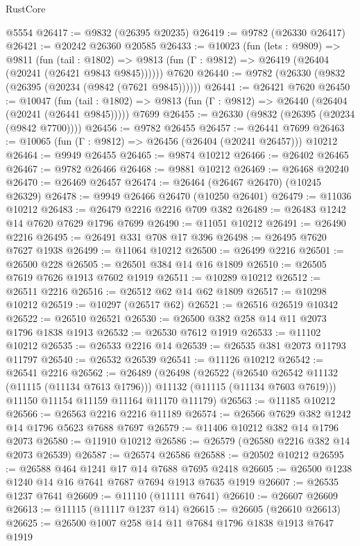 \begin{lexlean}{RustCore}
\begin{coremodule}
    @5554
@26417 := @9832 (@26395 @20235)
@26419 := @9782 (@26330 @26417)
@26421 := @20242 @26360 @20585
@26433 := @10023
    (fun (lets : @9809) =>
    @9811
      (fun (tail : @1802) =>
      @9813 (fun (Γ : @9812) => @26419 (@26404 (@20241 (@26421 @9843 @9845))))))
    @7620
@26440 := @9782 (@26330 (@9832 (@26395 (@20234 (@9842 (@7621 @9845))))))
@26441 := @26421 @7620
@26450 := @10047
    (fun (tail : @1802) => @9813 (fun (Γ : @9812) => @26440 (@26404 (@20241 (@26441 @9845)))))
    @7699
@26455 := @26330 (@9832 (@26395 (@20234 (@9842 @7700))))
@26456 := @9782 @26455
@26457 := @26441 @7699
@26463 := @10065 (fun (Γ : @9812) => @26456 (@26404 (@20241 @26457))) @10212
@26464 := @9949 @26455
@26465 := @9874 @10212
@26466 := @26402 @26465
@26467 := @9782 @26466
@26468 := @9881 @10212
@26469 := @26468 @20240
@26470 := @26469 @26457
@26474 := @26464 (@26467 @26470) (@10245 @26329)
@26478 := @9949 @26466 @26470 (@10250 @26401)
@26479 := @11036 @10212
@26483 := @26479 @2216 @2216 @709 @382
@26489 := @26483 @1242 @14 @7620 @7629 @1796 @7699
@26490 := @11051 @10212
@26491 := @26490 @2216
@26495 := @26491 @331 @708 @17 @396
@26498 := @26495 @7620 @7627 @1938
@26499 := @11064 @10212
@26500 := @26499 @2216
@26501 := @26500 @228
@26505 := @26501 @384 @14 @16 @1809
@26510 := @26505 @7619 @7626 @1913 @7602 @1919
@26511 := @10289 @10212
@26512 := @26511 @2216
@26516 := @26512 @62 @14 @62 @1809
@26517 := @10298 @10212
@26519 := @10297 (@26517 @62)
@26521 := @26516 @26519 @10342
@26522 := @26510 @26521
@26530 := @26500 @382 @258 @14 @11 @2073 @1796 @1838 @1913
@26532 := @26530 @7612 @1919
@26533 := @11102 @10212
@26535 := @26533 @2216 @14
@26539 := @26535 @381 @2073 @11793 @11797
@26540 := @26532 @26539
@26541 := @11126 @10212
@26542 := @26541 @2216
@26562 := @26489
    (@26498
      (@26522
        (@26540 @26542 @11132 (@11115 (@11134 @7613 @1796)))
        @11132
        (@11115 (@11134 @7603 @7619)))
      @11150
      @11154
      @11159
      @11164
      @11170
      @11179)
@26563 := @11185 @10212
@26566 := @26563 @2216 @2216 @11189
@26574 := @26566 @7629 @382 @1242 @14 @1796 @5623 @7688 @7697
@26579 := @11406 @10212 @382 @14 @1796 @2073
@26580 := @11910 @10212
@26586 := @26579 (@26580 @2216 @382 @14 @2073 @26539)
@26587 := @26574 @26586
@26588 := @20502 @10212
@26595 := @26588 @464 @1241 @17 @14 @7688 @7695 @2418
@26605 := @26500 @1238 @1240 @14 @16 @7641 @7687 @7694 @1913 @7635 @1919
@26607 := @26535 @1237 @7641
@26609 := @11110 (@11111 @7641)
@26610 := @26607 @26609
@26613 := @11115 (@11117 @1237 @14)
@26615 := @26605 (@26610 @26613)
@26625 := @26500 @1007 @258 @14 @11 @7684 @1796 @1838 @1913 @7647 @1919

\end{coremodule}
\end{lexlean}
